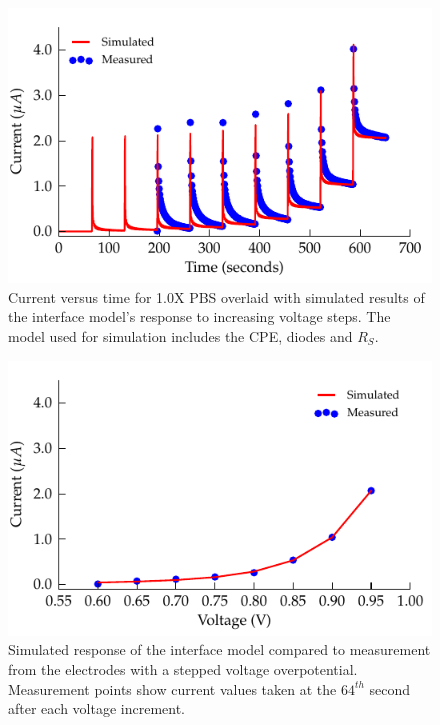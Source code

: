 \documentclass[journal, a4paper]{IEEEtran}
\begin{document}
{\begin{figure}
    \begin{center}
        \includegraphics{graphics/faradaic_currentVsTimeIEEE}
    \end{center}
    \caption{Current versus time for 1.0X PBS overlaid with simulated results of the interface model's response to increasing voltage steps. The model used for simulation includes the CPE, diodes and $R_{S}$.}
    \label{fig:faradaic_currentVsTime}
\end{figure}

\begin{figure}
    \begin{center}
        \includegraphics{graphics/faradaic_currentVsVoltageIEEE}
    \end{center}
    \caption{Simulated response of the interface model compared to measurement from the electrodes with a stepped voltage overpotential. Measurement points show current values taken at the $64^{th}$ second after each voltage increment.}
    \label{fig:faradaic_currentVsVoltage}
\end{figure}

}
\end{document}
